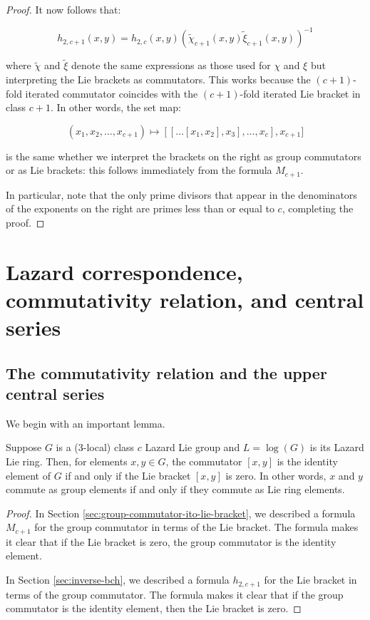 \documentclass{ucetd}
\begin{document}
\begin{proof}
 It now follows that:

 $$h_{2,c+1}(x,y) = h_{2,c}(x,y)(\tilde{\chi}_{c+1}(x,y)\tilde{\xi}_{c+1}(x,y))^{-1}$$

 where $\tilde{\chi}$ and $\tilde{\xi}$ denote the same expressions as
 those used for $\chi$ and $\xi$ but interpreting the Lie brackets as
 commutators. This works because the $(c+1)$-fold iterated commutator
 coincides with the $(c + 1)$-fold iterated Lie bracket in class $c +
 1$. In other words, the set map:

$$(x_1,x_2,\dots,x_{c+1}) \mapsto [[ \dots [x_1,x_2],x_3],\dots,x_c],x_{c+1}]$$

is the same whether we interpret the brackets on the right as group
commutators or as Lie brackets: this follows immediately from the
formula $M_{c+1}$.

 In particular, note that the only prime divisors that appear in the
 denominators of the exponents on the right are primes less than or
 equal to $c$, completing the proof.
\end{proof}

\section{Lazard correspondence, commutativity relation, and central series}

\subsection{The commutativity relation and the upper central series}

We begin with an important lemma.

\begin{lemma}\label{lemma:commutativity-relation-same-group-lie-ring}
  Suppose $G$ is a ($3$-local) class $c$ Lazard Lie group and $L =
  \log(G)$ is its Lazard Lie ring. Then, for elements $x,y \in G$, the
  commutator $[x,y]$ is the identity element of $G$ if and only if the
  Lie bracket $[x,y]$ is zero. In other words, $x$ and $y$ commute as
  group elements if and only if they commute as Lie ring elements.
\end{lemma}

\begin{proof}
  In Section \ref{sec:group-commutator-ito-lie-bracket}, we described
  a formula $M_{c+1}$ for the group commutator in terms of the Lie
  bracket. The formula makes it clear that if the Lie bracket is zero,
  the group commutator is the identity element.

  In Section \ref{sec:inverse-bch}, we described a formula $h_{2,c+1}$
  for the Lie bracket in terms of the group commutator. The formula
  makes it clear that if the group commutator is the identity element,
  then the Lie bracket is zero.
\end{proof}
\end{document}
